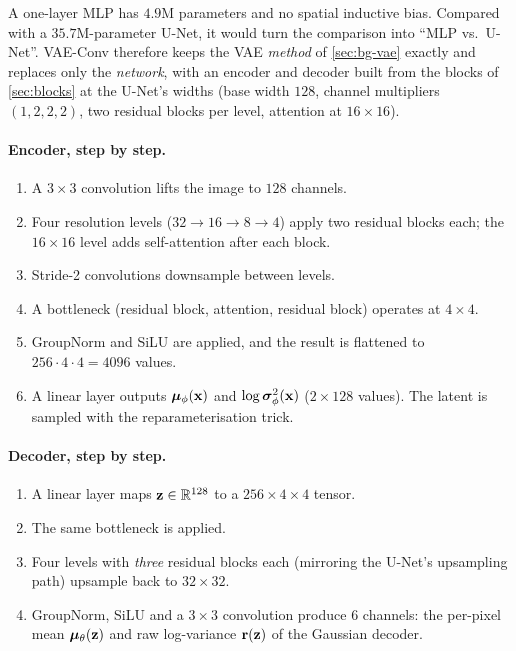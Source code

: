 A one-layer MLP has $4.9$M parameters and no spatial inductive bias. Compared with a $35.7$M-parameter U-Net, it
would turn the comparison into ``MLP vs.\ U-Net''. VAE-Conv therefore keeps the VAE \emph{method} of
\cref{sec:bg-vae} exactly and replaces only the \emph{network}, with an encoder and decoder built from the blocks
of \cref{sec:blocks} at the U-Net's widths (base width $128$, channel multipliers $(1,2,2,2)$, two residual blocks
per level, attention at $16\times16$).

\paragraph{Encoder, step by step.}
\begin{enumerate}
  \item A $3\times3$ convolution lifts the image to $128$ channels.
  \item Four resolution levels ($32\to16\to8\to4$) apply two residual blocks each; the $16\times16$ level adds
        self-attention after each block.
  \item Stride-2 convolutions downsample between levels.
  \item A bottleneck (residual block, attention, residual block) operates at $4\times4$.
  \item GroupNorm and SiLU are applied, and the result is flattened to $256\cdot4\cdot4=4096$ values.
  \item A linear layer outputs $\bm{\mu}_\phi(\mathbf{x})$ and $\log\bm{\sigma}^2_\phi(\mathbf{x})$ ($2\times128$ values). The latent is
        sampled with the reparameterisation trick.
\end{enumerate}

\paragraph{Decoder, step by step.}
\begin{enumerate}
  \item A linear layer maps $\mathbf{z}\in\mathbb{R}^{128}$ to a $256\times4\times4$ tensor.
  \item The same bottleneck is applied.
  \item Four levels with \emph{three} residual blocks each (mirroring the U-Net's upsampling path) upsample back to
        $32\times32$.
  \item GroupNorm, SiLU and a $3\times3$ convolution produce $6$ channels: the per-pixel mean $\bm{\mu}_\theta(\mathbf{z})$
        and raw log-variance $\mathbf{r}(\mathbf{z})$ of the Gaussian decoder.
\end{enumerate}

